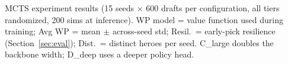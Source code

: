 \documentclass[journal]{IEEEtran}
\providecommand{\DIFaddtex}[1]{{\protect\color{blue} \sf #1}} %
\providecommand{\DIFdeltex}[1]{{\protect\color{red} \scriptsize #1}} %
\providecommand{\DIFdelbegin}{} %
\providecommand{\DIFaddFL}[1]{\DIFadd{#1}} %
\providecommand{\DIFdelFL}[1]{\DIFdel{#1}} %
\providecommand{\DIFaddbeginFL}{} %
\providecommand{\DIFaddendFL}{} %
\providecommand{\DIFdelbeginFL}{} %
\providecommand{\DIFdelendFL}{} %
\providecommand{\DIFadd}[1]{\texorpdfstring{\DIFaddtex{#1}}{#1}} %
\providecommand{\DIFdel}[1]{\texorpdfstring{\DIFdeltex{#1}}{}} %
\begin{document}
\DIFdelbegin %
\DIFdelendFL \DIFaddbeginFL \begin{table}[t]
\DIFaddendFL \centering
\DIFdelbeginFL %
{%
\DIFdelFL{MCTS experiment results (15 seeds $\times$ 600 drafts per configuration, all tiers randomized, 200 sims at inference). WP model = value function used during training; Avg WP = mean $\pm$ across-seed std; Resil.\ = early-pick resilience (Section~\ref{sec:eval}); Dist.\ = distinct heroes per seed. C\_large doubles the backbone width; D\_deep uses a deeper policy head.}}
\DIFdelendFL \DIFaddbeginFL \caption{\DIFaddFL{MCTS benchmark (5 seeds, E and in-sample rows 3 seeds, $\times$ 1,000 drafts; 200 simulations at inference, root temperature 1). Train: the value function the configuration optimized (K: the hero-identity model). gN, RN, QM26: composition-corrected references (Section~\ref{sec:refs}); gN seed SE 0.002--0.003.}}
\DIFaddendFL \label{tab:mcts}
\DIFdelbeginFL %

\end{table}
\end{document}
